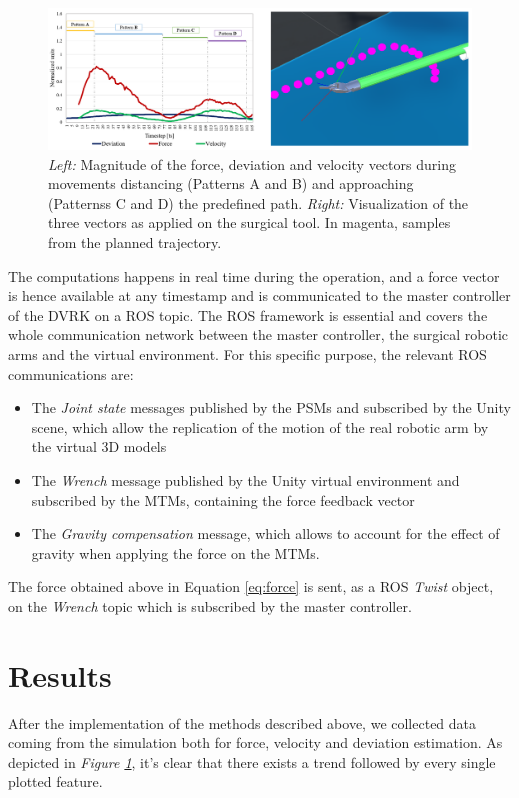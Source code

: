 \documentclass[conference]{IEEEtran}
\begin{document}
\begin{figure}
    \centering
    \includegraphics[width=\linewidth]{plotandee.png}
    \caption{\textit{Left:} Magnitude of the force, deviation and velocity vectors during movements distancing (Patterns A and B) and approaching (Patternss C and D) the predefined path. \textit{Right:} Visualization of the three vectors as applied on the surgical tool. In magenta, samples from the planned trajectory.}
    \label{fig:plots}
\end{figure}

The computations happens in real time during the operation, and a force vector is hence available at any timestamp and is communicated to the master controller of the DVRK on a ROS topic.
The ROS framework is essential and covers the whole communication network between the master controller, the surgical robotic arms and the virtual environment. For this specific purpose, the relevant ROS communications are:
\begin{itemize}
    \item The \textit{Joint state} messages published by the PSMs and subscribed by the Unity scene, which allow the replication of the motion of the real robotic arm by the virtual 3D models
    \item The \textit{Wrench} message published by the Unity virtual environment and subscribed by the MTMs, containing the force feedback vector
    \item The \textit{Gravity compensation} message, which allows to account for the effect of gravity when applying the force on the MTMs.
\end{itemize}

The force obtained above in Equation \ref{eq:force} is sent, as a ROS \textit{Twist} object, on the \textit{Wrench} topic which is subscribed by the master controller.

\section{Results}
After the implementation of the methods described above, we collected data coming from the simulation both for force, velocity and deviation estimation. As depicted in   \textit{Figure \ref{fig:plots}}, it’s clear that there exists a trend followed by every single plotted feature.
\end{document}
